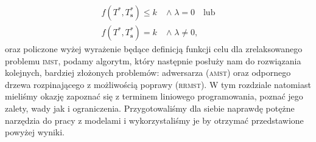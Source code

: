 \begin{align}
	f \left( T^{\ast}, T^{\ast}_{\textbf{s}} \right) \leqslant k \; & \wedge \; \lambda = 0 \quad \text{lub}\label{eq:imstoptcond1}\\
	f \left( T^{\ast}, T^{\ast}_{\textbf{s}} \right) = k \; & \wedge \; \lambda \neq 0\text{,}\label{eq:imstoptcond2}
\end{align}\label{eq:imstcompl}
oraz policzone wyżej wyrażenie będące definicją funkcji celu dla zrelaksowanego problemu \textsc{imst}, podamy algorytm, który następnie posłuży nam do rozwiązania kolejnych, bardziej złożonych problemów: adwersarza (\textsc{amst}) oraz odpornego drzewa rozpinającego z możliwością poprawy (\textsc{rrmst}). W tym rozdziale natomiast mieliśmy okazję zapoznać się z terminem liniowego programowania, poznać jego zalety, wady jak i ograniczenia. Przygotowaliśmy dla siebie naprawdę potężne narzędzia do pracy z modelami i wykorzystaliśmy je by otrzymać przedstawione powyżej wyniki.